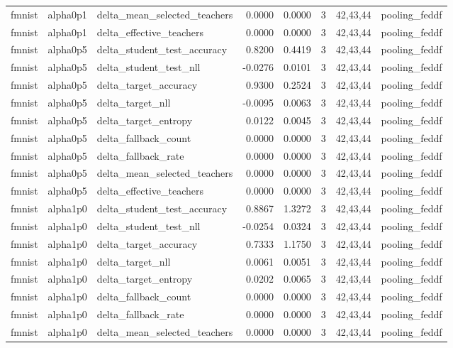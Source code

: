\begin{tabular}{lllrrrll}
fmnist & alpha0p1 & delta\_mean\_selected\_teachers & 0.0000 & 0.0000 & 3 & 42,43,44 & pooling\_feddf \\
fmnist & alpha0p1 & delta\_effective\_teachers & 0.0000 & 0.0000 & 3 & 42,43,44 & pooling\_feddf \\
fmnist & alpha0p5 & delta\_student\_test\_accuracy & 0.8200 & 0.4419 & 3 & 42,43,44 & pooling\_feddf \\
fmnist & alpha0p5 & delta\_student\_test\_nll & -0.0276 & 0.0101 & 3 & 42,43,44 & pooling\_feddf \\
fmnist & alpha0p5 & delta\_target\_accuracy & 0.9300 & 0.2524 & 3 & 42,43,44 & pooling\_feddf \\
fmnist & alpha0p5 & delta\_target\_nll & -0.0095 & 0.0063 & 3 & 42,43,44 & pooling\_feddf \\
fmnist & alpha0p5 & delta\_target\_entropy & 0.0122 & 0.0045 & 3 & 42,43,44 & pooling\_feddf \\
fmnist & alpha0p5 & delta\_fallback\_count & 0.0000 & 0.0000 & 3 & 42,43,44 & pooling\_feddf \\
fmnist & alpha0p5 & delta\_fallback\_rate & 0.0000 & 0.0000 & 3 & 42,43,44 & pooling\_feddf \\
fmnist & alpha0p5 & delta\_mean\_selected\_teachers & 0.0000 & 0.0000 & 3 & 42,43,44 & pooling\_feddf \\
fmnist & alpha0p5 & delta\_effective\_teachers & 0.0000 & 0.0000 & 3 & 42,43,44 & pooling\_feddf \\
fmnist & alpha1p0 & delta\_student\_test\_accuracy & 0.8867 & 1.3272 & 3 & 42,43,44 & pooling\_feddf \\
fmnist & alpha1p0 & delta\_student\_test\_nll & -0.0254 & 0.0324 & 3 & 42,43,44 & pooling\_feddf \\
fmnist & alpha1p0 & delta\_target\_accuracy & 0.7333 & 1.1750 & 3 & 42,43,44 & pooling\_feddf \\
fmnist & alpha1p0 & delta\_target\_nll & 0.0061 & 0.0051 & 3 & 42,43,44 & pooling\_feddf \\
fmnist & alpha1p0 & delta\_target\_entropy & 0.0202 & 0.0065 & 3 & 42,43,44 & pooling\_feddf \\
fmnist & alpha1p0 & delta\_fallback\_count & 0.0000 & 0.0000 & 3 & 42,43,44 & pooling\_feddf \\
fmnist & alpha1p0 & delta\_fallback\_rate & 0.0000 & 0.0000 & 3 & 42,43,44 & pooling\_feddf \\
fmnist & alpha1p0 & delta\_mean\_selected\_teachers & 0.0000 & 0.0000 & 3 & 42,43,44 & pooling\_feddf \\

\end{tabular}
